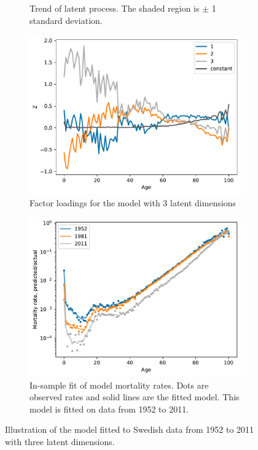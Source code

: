 \documentclass[preprint,12pt]{elsarticle}
\begin{document}
\begin{figure}
\begin{subfigure}[b]{0.45\textwidth}
        \caption{Trend of latent process. The shaded region is $\pm$ 1 standard deviation.}
    \end{subfigure}
    \hfill
    \begin{subfigure}[b]{0.45\textwidth}
        \centering
        \includegraphics[width=\textwidth]{figs/sweden_1952_2011_Male_100_1_3loadings.pdf}
        \caption{Factor loadings for the model with 3 latent dimensions}
    \end{subfigure}
    \hfill
    \begin{subfigure}[b]{0.45\textwidth}
        \centering
        \includegraphics[width=\textwidth]{figs/sweden_1952_2011_Male_100_1_3rateVsAge.pdf}
        \caption{In-sample fit of model mortality rates. Dots are observed rates and solid lines are the fitted model. This model is fitted on data from 1952 to 2011.}
        \label{fig:mortality_rates_in_sample_fit_sweden}
    \end{subfigure}
 
    \caption{Illustration of the model fitted to Swedish data from 1952 to 2011 with three latent dimensions.}
    \label{fig:model_illustration_sweden}
\end{figure}
\end{document}
